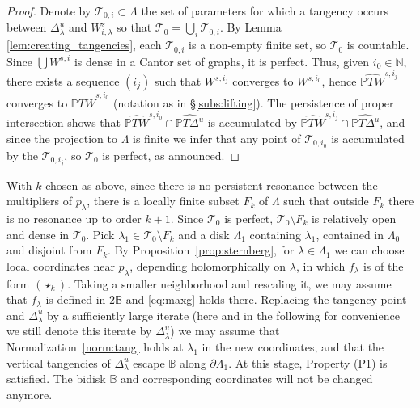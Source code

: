 \documentclass[11pt, oneside]{amsart}
\newcommand{\B}{\mathbb{B}}
\newcommand{\N}{\mathbb{N}}
\renewcommand{\P}{\mathbb{P}}
\newcommand{\fr}{\partial}
\newcommand{\la}{\lambda}
\theoremstyle{remark}
\theoremstyle{definition}
\theoremstyle{theorem}
\begin{document}
\begin{proof}
Denote by $\mathcal T_{0,i}\subset \Lambda$   the  set of parameters for which  a  
tangency occurs between $\Delta^u_\la$ and  $W^s_{i, \lambda}$ so that 
$\mathcal T_0 = \bigcup_i \mathcal T_{0,i}$. By Lemma \ref{lem:creating_tangencies}, 
each $\mathcal T_{0,i}$ is a non-empty finite set, so $\mathcal T_0$ is countable. 
 Since $\bigcup W^{s,i}$ is dense in a Cantor set of graphs, it is perfect. Thus, given $i_0\in \N$,   there exists a sequence $(i_j)$ such that $W^{s,{i_j}}$ converges to $W^{s,{i_0}}$, hence $\widehat{\P T W}^{s,{i_j}}$ converges to $\widehat{\P T W}^{s,{i_0}}$ (notation as in \S\ref{subs:lifting}). The persistence of proper intersection shows that   $\widehat{\P T W}^{s,{i_0}}\cap \widehat{\P T \Delta^u}$ is accumulated 
 by  $\widehat{\P T W}^{s,{i_j}}\cap \widehat{\P T \Delta^u}$, and since the projection to
  $\Lambda$ is finite we infer that 
 any point of $\mathcal T_{0,i_0}$ is accumulated by the $\mathcal T_{0,i_j}$, 
 so $\mathcal T_0$ is perfect, as announced. 
\end{proof}

 


With $k$ chosen as above, since there is no 
persistent resonance between the multipliers of $p_\lambda$, there is a locally 
finite subset $F_k$ of $\Lambda$ such that outside $F_k$ there is no 
resonance up to order $k+1$.  Since $\mathcal T_0$ is perfect, 
 $\mathcal T_0\setminus F_k$     is relatively open and dense in $\mathcal T_0$.
Pick  $\lambda_1\in \mathcal T_0\setminus F_k$  and a   disk 
$\Lambda_1 $  containing    $\lambda_1$,  contained in $\Lambda_0$ and disjoint from $F_k$.  By Proposition~\ref{prop:sternberg}, for $\lambda \in \Lambda_1$
we can choose local coordinates near $p_\lambda$, 
depending holomorphically on $\lambda$,  
in which $f_\lambda$ is of the form  $(\star_k)$. Taking a smaller 
neighborhood and rescaling it, we may assume that $f_\lambda$ is defined in $2\B$ and 
\eqref{eq:maxg} holds there. Replacing the  tangency point and 
  $\Delta^u_\lambda$ by a sufficiently large iterate (here and in the following for convenience 
  we still denote this iterate  by $\Delta^u_\lambda$)  we may assume that Normalization~\ref{norm:tang} holds at $\lambda_1$ in the new coordinates, and that    the vertical tangencies of $\Delta^u_\lambda$ 
  escape $\B$  along $\fr\Lambda_1$. At this stage, Property (P1) is satisfied. The bidisk $\B$ and corresponding coordinates will not be changed anymore. 
\end{document}
